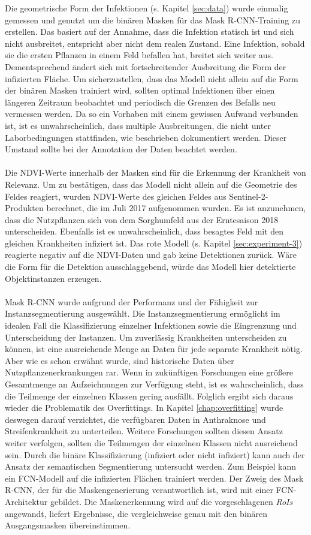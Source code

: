 Die geometrische Form der Infektionen (s. Kapitel \ref{sec:data}) wurde einmalig gemessen und genutzt um die binären Masken für das Mask R-CNN-Training zu erstellen. Das basiert auf der Annahme, dass die Infektion statisch ist und sich nicht ausbreitet, entspricht aber nicht dem realen Zustand. Eine Infektion, sobald sie die ersten Pflanzen in einem Feld befallen hat, breitet sich weiter aus. Dementsprechend ändert sich mit fortschreitender Ausbreitung die Form der infizierten Fläche. Um sicherzustellen, dass das Modell nicht allein auf die Form der binären Masken trainiert wird, sollten optimal Infektionen über einen längeren Zeitraum beobachtet und periodisch die Grenzen des Befalls neu vermessen werden. Da so ein Vorhaben mit einem gewissen Aufwand verbunden ist, ist es unwahrscheinlich, dass multiple Ausbreitungen, die nicht unter Laborbedingungen stattfinden, wie beschrieben dokumentiert werden. Dieser Umstand sollte bei der Annotation der Daten beachtet werden.
\\\\
Die NDVI-Werte innerhalb der Masken sind für die Erkennung der Krankheit von Relevanz. Um zu bestätigen, dass das Modell nicht allein auf die Geometrie des Feldes reagiert, wurden NDVI-Werte des gleichen Feldes aus Sentinel-2-Produkten berechnet, die im Juli 2017 aufgenommen wurden. Es ist anzunehmen, dass die Nutzpflanzen sich von dem Sorghumfeld aus der Erntesaison 2018 unterscheiden. Ebenfalls ist es unwahrscheinlich, dass besagtes Feld mit den gleichen Krankheiten infiziert ist. Das rote Modell (s. Kapitel \ref{sec:experiment-3}) reagierte negativ auf die NDVI-Daten und gab keine Detektionen zurück. Wäre die Form für die Detektion ausschlaggebend, würde das Modell hier detektierte Objektinstanzen erzeugen.
\\\\
Mask R-CNN wurde aufgrund der Performanz und der Fähigkeit zur Instanzsegmentierung ausgewählt. Die Instanzsegmentierung ermöglicht im idealen Fall die Klassifizierung einzelner Infektionen sowie die Eingrenzung und Unterscheidung der Instanzen. Um zuverlässig Krankheiten unterscheiden zu können, ist eine ausreichende Menge an Daten für jede separate Krankheit nötig. Aber wie es schon erwähnt wurde, sind historische Daten über Nutzpflanzenerkrankungen rar. Wenn in zukünftigen Forschungen eine größere Gesamtmenge an Aufzeichnungen zur Verfügung steht, ist es wahrscheinlich, dass die Teilmenge der einzelnen Klassen gering ausfällt. Folglich ergibt sich daraus wieder die Problematik des Overfittings. In Kapitel \ref{chap:overfitting} wurde deswegen darauf verzichtet, die verfügbaren Daten in Anthraknose und Streifenkrankheit zu unterteilen. Weitere Forschungen sollten diesen Ansatz weiter verfolgen, sollten die Teilmengen der einzelnen Klassen nicht ausreichend sein. Durch die binäre Klassifizierung (infiziert oder nicht infiziert) kann auch der Ansatz der semantischen Segmentierung untersucht werden. Zum Beispiel kann ein FCN-Modell auf die infizierten Flächen trainiert werden. Der Zweig des Mask R-CNN, der für die Maskengenerierung verantwortlich ist, wird mit einer FCN-Architektur gebildet. Die Maskenerkennung wird auf die vorgeschlagenen \textit{RoIs} angewandt, liefert Ergebnisse, die vergleichweise genau mit den binären Ausgangsmasken übereinstimmen.
